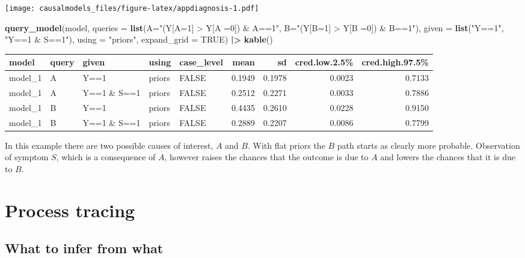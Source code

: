\documentclass[
  12pt,
]{book}
\newenvironment{Shaded}{\begin{snugshade}}{\end{snugshade}}
\newcommand{\AttributeTok}[1]{\textcolor[rgb]{0.13,0.29,0.53}{#1}}
\newcommand{\ConstantTok}[1]{\textcolor[rgb]{0.56,0.35,0.01}{#1}}
\newcommand{\FunctionTok}[1]{\textcolor[rgb]{0.13,0.29,0.53}{\textbf{#1}}}
\newcommand{\NormalTok}[1]{#1}
\newcommand{\SpecialCharTok}[1]{\textcolor[rgb]{0.81,0.36,0.00}{\textbf{#1}}}
\newcommand{\StringTok}[1]{\textcolor[rgb]{0.31,0.60,0.02}{#1}}
\begin{document}
\texttt{[image: causalmodels\_files/figure-latex/appdiagnosis-1.pdf]}

\begin{Shaded}
\begin{Highlighting}[]
\FunctionTok{query\_model}\NormalTok{(model, }
       \AttributeTok{queries =} \FunctionTok{list}\NormalTok{(}\AttributeTok{A=}\StringTok{"(Y[A=1] \textgreater{} Y[A =0]) \& A==1"}\NormalTok{, }\AttributeTok{B=}\StringTok{"(Y[B=1] \textgreater{} Y[B =0]) \& B==1"}\NormalTok{),}
       \AttributeTok{given =} \FunctionTok{list}\NormalTok{(}\StringTok{"Y==1"}\NormalTok{,  }\StringTok{"Y==1 \& S==1"}\NormalTok{), }\AttributeTok{using =} \StringTok{"priors"}\NormalTok{, }
       \AttributeTok{expand\_grid =} \ConstantTok{TRUE}\NormalTok{) }\SpecialCharTok{|\textgreater{}} \FunctionTok{kable}\NormalTok{()}
\end{Highlighting}
\end{Shaded}

\begin{tabular}{l|l|l|l|l|r|r|r|r}
\hline
model & query & given & using & case\_level & mean & sd & cred.low.2.5\% & cred.high.97.5\%\\
\hline
model\_1 & A & Y==1 & priors & FALSE & 0.1949 & 0.1978 & 0.0023 & 0.7133\\
\hline
model\_1 & A & Y==1 \& S==1 & priors & FALSE & 0.2512 & 0.2271 & 0.0033 & 0.7886\\
\hline
model\_1 & B & Y==1 & priors & FALSE & 0.4435 & 0.2610 & 0.0228 & 0.9150\\
\hline
model\_1 & B & Y==1 \& S==1 & priors & FALSE & 0.2889 & 0.2207 & 0.0086 & 0.7799\\
\hline
\end{tabular}

In this example there are two possible causes of interest, \(A\) and \(B\). With flat priors the \(B\) path starts as clearly more probable. Observation of symptom \(S\), which is a consequence of \(A\), however raises the chances that the outcome is due to \(A\) and lowers the chances that it is due to \(B\).

\hypertarget{process-tracing}{%
\chapter{Process tracing}\label{process-tracing}}

\hypertarget{what-to-infer-from-what}{%
\section{What to infer from what}\label{what-to-infer-from-what}}
\end{document}
